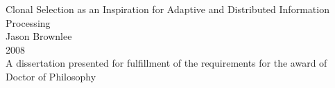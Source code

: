 
%
%


\begin{titlepage}
\begin{center}

\vspace*{\fill} \Huge
Clonal Selection as an Inspiration for Adaptive and Distributed Information Processing
\\
\vfill\vfill\Large
Jason Brownlee
\\
\vfill\vfill
2008
\\
\vfill\vfill \normalsize
A dissertation presented for fulfillment of the requirements for the award of \\
Doctor of Philosophy

\vfill         

\end{center}

\end{titlepage}

